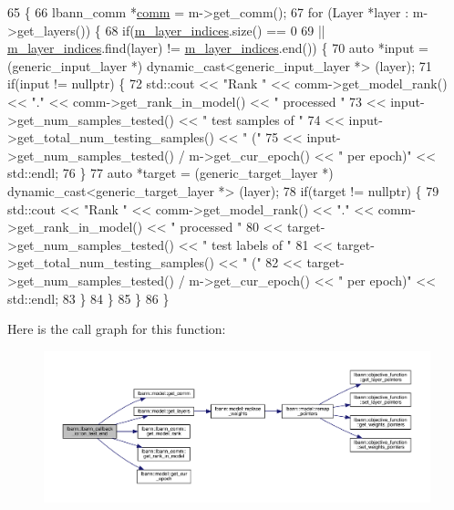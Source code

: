\begin{DoxyCode}
65                                             \{
66   lbann\_comm *\hyperlink{file__io_8cpp_ab048c6f9fcbcfaa57ce68b00263dbebe}{comm} = m->get\_comm();
67   \textcolor{keywordflow}{for} (Layer *layer : m->get\_layers()) \{
68     \textcolor{keywordflow}{if}(\hyperlink{classlbann_1_1lbann__callback__io_ab2105f5ed94c9c053b2873ea3a87bc21}{m\_layer\_indices}.size() == 0
69        || \hyperlink{classlbann_1_1lbann__callback__io_ab2105f5ed94c9c053b2873ea3a87bc21}{m\_layer\_indices}.find(layer) != \hyperlink{classlbann_1_1lbann__callback__io_ab2105f5ed94c9c053b2873ea3a87bc21}{m\_layer\_indices}.end()) \{
70       \textcolor{keyword}{auto} *input = (generic\_input\_layer *) dynamic\_cast<generic\_input\_layer *> (layer);
71       \textcolor{keywordflow}{if}(input != \textcolor{keyword}{nullptr}) \{
72         std::cout << \textcolor{stringliteral}{"Rank "} << comm->get\_model\_rank() << \textcolor{stringliteral}{"."} << comm->get\_rank\_in\_model() << \textcolor{stringliteral}{" processed "}
73                   << input->get\_num\_samples\_tested() << \textcolor{stringliteral}{" test samples of "}
74                   << input->get\_total\_num\_testing\_samples() << \textcolor{stringliteral}{" ("}
75                   << input->get\_num\_samples\_tested() / m->get\_cur\_epoch() << \textcolor{stringliteral}{" per epoch)"} << std::endl;
76       \}
77       \textcolor{keyword}{auto} *target = (generic\_target\_layer *) dynamic\_cast<generic\_target\_layer *> (layer);
78       \textcolor{keywordflow}{if}(target != \textcolor{keyword}{nullptr}) \{
79         std::cout << \textcolor{stringliteral}{"Rank "} << comm->get\_model\_rank() << \textcolor{stringliteral}{"."} << comm->get\_rank\_in\_model() << \textcolor{stringliteral}{" processed "}
80                   << target->get\_num\_samples\_tested() << \textcolor{stringliteral}{" test labels of "}
81                   << target->get\_total\_num\_testing\_samples() << \textcolor{stringliteral}{" ("}
82                   << target->get\_num\_samples\_tested() / m->get\_cur\_epoch() << \textcolor{stringliteral}{" per epoch)"} << std::endl;
83       \}
84     \}
85   \}
86 \}
\end{DoxyCode}
Here is the call graph for this function\+:\nopagebreak
\begin{figure}[H]
\begin{center}
\leavevmode
\includegraphics[width=350pt]{classlbann_1_1lbann__callback__io_a8abca84e4b0dc21b28e5d5e409446fdc_cgraph}
\end{center}
\end{figure}

